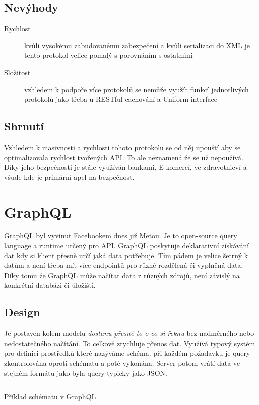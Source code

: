 \subsection{Nevýhody}
\begin{description}
    \item[Rychlost] kvůli vysokému zabudovanému zabezpečení a kvůli serializaci do XML je tento protokol velice pomalý s porovnáním s ostatními
    \item[Složitost] vzhledem k podpoře více protokolů se nemůže využít funkcí jednotlivých protokolů jako třeba u RESTful cachování a Uniform interface
\end{description}

\subsection{Shrnutí}
Vzhledem k masivnosti a rychlosti tohoto protokolu se od něj upouští aby se optimalizovala rychlost tvořených API. To ale neznamená že se už nepoužívá. Díky jeho bezpečnosti je stále využíván bankami, E-komercí, ve zdravotnicví a všude kde je primární apel na bezpečnost.

\section{GraphQL}
GraphQL byl vyvinut Facebookem dnes již Metou. Je to open-source query language a runtime určený pro API. GraphQL poskytuje deklarativní získávání dat kdy si klient přesně určí jaká data potřebuje. Tím pádem je velice šetrný k datům a není třeba mít více endpointů pro různě rozdělená či vyplněná data. Díky tomu že GraphQL může načítat data z různých zdrojů, není závislý na konkrétní databázi či úložišti.

\subsection{Design}
Je postaven kolem modelu \textit{dostanu přesně to o co si řeknu} bez nadměrného nebo nedostatečného načítání. To celkově zrychluje přenos dat. Využívá typový systém pro definici prostředků které nazýváme schéma. při každém požadavku je query zkontrolována oproti schématu a poté vykonána. Server potom vrátí data ve stejném formátu jako byla query typicky jako JSON.

\begin{listing}[ht!]
    \inputminted[]{ts}{resources/code/standards/playertype.gql}
    \caption{Příklad schématu v GraphQL}
    \label{code:gql_type}
\end{listing}


